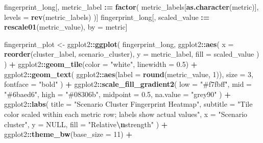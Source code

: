 \documentclass[
]{article}
\newenvironment{Shaded}{\begin{snugshade}}{\end{snugshade}}
\newcommand{\AttributeTok}[1]{\textcolor[rgb]{0.13,0.29,0.53}{#1}}
\newcommand{\ConstantTok}[1]{\textcolor[rgb]{0.56,0.35,0.01}{#1}}
\newcommand{\DecValTok}[1]{\textcolor[rgb]{0.00,0.00,0.81}{#1}}
\newcommand{\FloatTok}[1]{\textcolor[rgb]{0.00,0.00,0.81}{#1}}
\newcommand{\FunctionTok}[1]{\textcolor[rgb]{0.13,0.29,0.53}{\textbf{#1}}}
\newcommand{\NormalTok}[1]{#1}
\newcommand{\OtherTok}[1]{\textcolor[rgb]{0.56,0.35,0.01}{#1}}
\newcommand{\SpecialCharTok}[1]{\textcolor[rgb]{0.81,0.36,0.00}{\textbf{#1}}}
\newcommand{\StringTok}[1]{\textcolor[rgb]{0.31,0.60,0.02}{#1}}
\begin{document}
\begin{Shaded}
\begin{Highlighting}[]
\NormalTok{fingerprint\_long[, metric\_label }\SpecialCharTok{:=} \FunctionTok{factor}\NormalTok{(}
\NormalTok{  metric\_labels[}\FunctionTok{as.character}\NormalTok{(metric)],}
  \AttributeTok{levels =} \FunctionTok{rev}\NormalTok{(metric\_labels)}
\NormalTok{)]}
\NormalTok{fingerprint\_long[, scaled\_value }\SpecialCharTok{:=} \FunctionTok{rescale01}\NormalTok{(metric\_value), by }\OtherTok{=}\NormalTok{ metric]}

\NormalTok{fingerprint\_plot }\OtherTok{\textless{}{-}}\NormalTok{ ggplot2}\SpecialCharTok{::}\FunctionTok{ggplot}\NormalTok{(}
\NormalTok{  fingerprint\_long,}
\NormalTok{  ggplot2}\SpecialCharTok{::}\FunctionTok{aes}\NormalTok{(}
    \AttributeTok{x    =} \FunctionTok{reorder}\NormalTok{(cluster\_label, scenario\_cluster),}
    \AttributeTok{y    =}\NormalTok{ metric\_label,}
    \AttributeTok{fill =}\NormalTok{ scaled\_value}
\NormalTok{  )}
\NormalTok{) }\SpecialCharTok{+}
\NormalTok{  ggplot2}\SpecialCharTok{::}\FunctionTok{geom\_tile}\NormalTok{(}\AttributeTok{color =} \StringTok{"white"}\NormalTok{, }\AttributeTok{linewidth =} \FloatTok{0.5}\NormalTok{) }\SpecialCharTok{+}
\NormalTok{  ggplot2}\SpecialCharTok{::}\FunctionTok{geom\_text}\NormalTok{(}
\NormalTok{    ggplot2}\SpecialCharTok{::}\FunctionTok{aes}\NormalTok{(}\AttributeTok{label =} \FunctionTok{round}\NormalTok{(metric\_value, }\DecValTok{1}\NormalTok{)),}
    \AttributeTok{size =} \DecValTok{3}\NormalTok{, }\AttributeTok{fontface =} \StringTok{"bold"}
\NormalTok{  ) }\SpecialCharTok{+}
\NormalTok{  ggplot2}\SpecialCharTok{::}\FunctionTok{scale\_fill\_gradient2}\NormalTok{(}
    \AttributeTok{low =} \StringTok{"\#f7fbff"}\NormalTok{, }\AttributeTok{mid =} \StringTok{"\#6baed6"}\NormalTok{, }\AttributeTok{high =} \StringTok{"\#08306b"}\NormalTok{,}
    \AttributeTok{midpoint =} \FloatTok{0.5}\NormalTok{, }\AttributeTok{na.value =} \StringTok{"grey90"}
\NormalTok{  ) }\SpecialCharTok{+}
\NormalTok{  ggplot2}\SpecialCharTok{::}\FunctionTok{labs}\NormalTok{(}
    \AttributeTok{title    =} \StringTok{"Scenario Cluster Fingerprint Heatmap"}\NormalTok{,}
    \AttributeTok{subtitle =} \StringTok{"Tile color scaled within each metric row; labels show actual values"}\NormalTok{,}
    \AttributeTok{x        =} \StringTok{"Scenario cluster"}\NormalTok{,}
    \AttributeTok{y        =} \ConstantTok{NULL}\NormalTok{,}
    \AttributeTok{fill     =} \StringTok{"Relative}\SpecialCharTok{\textbackslash{}n}\StringTok{strength"}
\NormalTok{  ) }\SpecialCharTok{+}
\NormalTok{  ggplot2}\SpecialCharTok{::}\FunctionTok{theme\_bw}\NormalTok{(}\AttributeTok{base\_size =} \DecValTok{11}\NormalTok{) }\SpecialCharTok{+}

\end{Highlighting}
\end{Shaded}
\end{document}
